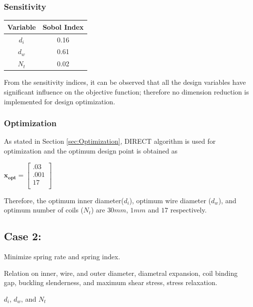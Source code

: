 \documentclass[10pt]{article}
\begin{document}
	
	\subsubsection{Sensitivity}
	
\begin{center}
	 \begin{tabular}{| c  | c |  }
	 	\hline Variable & Sobol Index\\
	 	\hline $d_{i}$ & 0.16 \\
		\hline $d_{w}$ & 0.61  \\
		\hline $N_{t}$ & 0.02 \\ 
		\hline
	 \end{tabular}
\end{center}

From the sensitivity indices, it can be observed that all the design variables have significant influence on the objective function; therefore no dimension reduction is implemented for design optimization. 

	\subsubsection{Optimization}
	
	As stated in Section \ref{sec:Optimization}, DIRECT algorithm is used for optimization and the optimum design point is obtained as 
	\begin{center}
	$\mathbf{x_{opt}} =
	\left[
	\begin{array}{c}
	 	 .03 \\
	 	 .001 \\
		 17    \\ 
		
	 \end{array}
	 \right]
$	
\end{center}
    Therefore, the optimum inner diameter($d_{i}$), optimum wire diameter ($d_{w}$), and optimum number of coils ($N_{t}$) are $30 mm$, $1 mm$ and $17$ respectively.
		
\newpage
\subsection{Case 2:}
\label{subsec:Case2}

\begin{description}[leftmargin=!,labelwidth=\widthof{\bfseries State Variables:}, labelindent = 1cm]
	\item[Objectives:] Minimize spring rate and spring index.\\
	\item[Constraints:] Relation on inner, wire, and outer diameter, diametral expansion, coil binding gap, buckling slenderness, and maximum shear stress, stress relaxation. \\
	\item[State Variables:] $d_{i}$, $d_{w}$, and $N_{t}$ \\
\end{description}
\end{document}
